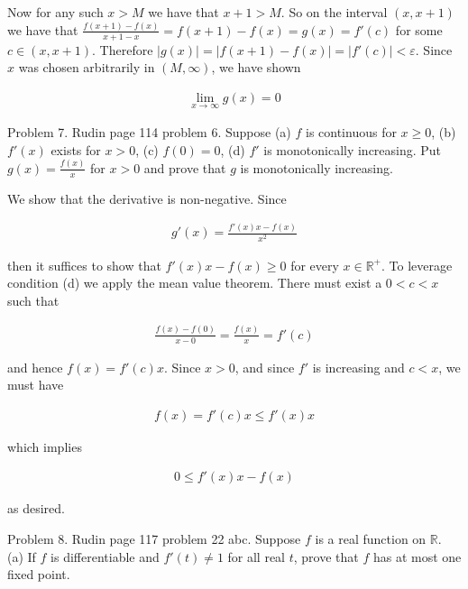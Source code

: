 \documentclass{article}
\begin{document}
  Now for any such $x>M$ we have that $x+1>M$.  So on the interval $(x,x+1)$ we have that $\frac{f(x+1)-f(x)}{x+1-x} = f(x+1)-f(x) = g(x) = f'(c)$ for some $c\in (x,x+1)$.  Therefore $|g(x)|=|f(x+1)-f(x)| = |f'(c)|<\varepsilon$.  Since $x$ was chosen arbitrarily in $(M,\infty)$, we have shown

  \begin{align*}
    \lim_{x\to \infty}g(x)=0
  \end{align*}

  \pagebreak

  {\Large \color{Sepia} Problem 7. Rudin page 114 problem 6. Suppose (a) $f$ is continuous for $x\geq 0$, (b) $f'(x)$ exists for $x>0$, (c) $f(0)=0$, (d) $f'$ is monotonically increasing.  Put $g(x)=\frac{f(x)}{x}$ for $x>0$ and prove that $g$ is monotonically increasing.}

  \vspace{1cm}

  We show that the derivative is non-negative.  Since

  \begin{align*}
    g'(x) = \frac{f'(x)x-f(x)}{x^2}
  \end{align*}

  then it suffices to show that $f'(x)x-f(x)\geq 0$ for every $x\in\mathbb R^+$.  To leverage condition (d) we apply the mean value theorem.  There must exist a $0 < c < x$ such that

  \begin{align*}
    \frac{f(x)-f(0)}{x-0} = \frac{f(x)}{x} = f'(c)
  \end{align*}

  and hence $f(x) = f'(c)x$.  Since $x > 0$, and since $f'$ is increasing and $c<x$, we must have

  \begin{align*}
    f(x) = f'(c)x \leq f'(x)x
  \end{align*}

  which implies

  \begin{align*}
    0\leq f'(x)x-f(x)
  \end{align*}

  as desired.

  \pagebreak

  {\Large \color{Sepia} Problem 8. Rudin page 117 problem 22 abc. Suppose $f$ is a real function on $\mathbb R$.  (a) If $f$ is differentiable and $f'(t)\ne 1$ for all real $t$, prove that $f$ has at most one fixed point.}
\end{document}
